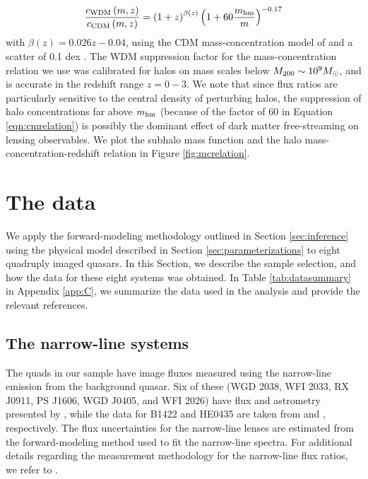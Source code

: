 \begin{equation}
\label{eqn:cmrelation}
\frac{c_{\rm{WDM}}\left(m, z\right)}{c_{\rm{CDM}}\left(m, z\right)} =  \left(1+z\right) ^{\beta\left(z\right)} \left(1+60\frac{m_{\rm{hm}}}{m}\right)^{-0.17}
\end{equation}
with $\beta \left(z\right) = 0.026z - 0.04$, using the CDM mass-concentration model of \citet{DiemerJoyce18} and a scatter of 0.1 dex \citep{Dutton++14}. The WDM suppression factor for the mass-concentration relation we use was calibrated for halos on mass scales below $M_{200} \sim 10^9 {M_{\odot}}$, and is accurate in the redshift range $z = 0 - 3$. We note that since flux ratios are particularly sensitive to the central density of perturbing halos, the suppression of halo concentrations far above ${m_{\rm{hm}}}$ (because of the factor of 60 in Equation \ref{eqn:cmrelation}) is possibly the dominant effect of dark matter free-streaming on lensing observables. We plot the subhalo mass function and the halo mass-concentration-redshift relation in Figure \ref{fig:mcrelation}. 

\section{The data}
\label{sec:data}
We apply the forward-modeling methodology outlined in Section \ref{sec:inference} using the physical model described in Section \ref{sec:parameterizations} to eight quadruply imaged quasars. In this Section, we describe the sample selection, and how the data for these eight systems was obtained. In Table \ref{tab:datasummary} in Appendix \ref{app:C}, we summarize the data used in the analysis and provide the relevant references.

\subsection{The narrow-line systems}
The quads in our sample have image fluxes measured using the narrow-line emission from the background quasar. Six of these (WGD 2038, WFI 2033, RX J0911, PS J1606, WGD J0405, and WFI 2026) have flux and astrometry presented by \citet{Nierenberg++19}, while the data for B1422 and HE0435 are taken from \citet{Nierenberg++14} and \citet{Nierenberg++17}, respectively. The flux uncertainties for the narrow-line lenses are estimated from the forward-modeling method used to fit the narrow-line spectra. For additional details regarding the measurement methodology for the narrow-line flux ratios, we refer to \citet{Nierenberg++17,Nierenberg++19}. 

